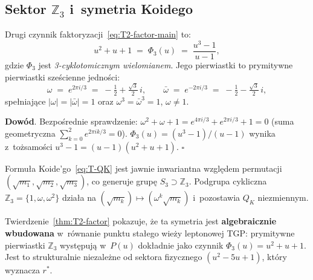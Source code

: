 \subsection{Sektor $\mathbb{Z}_3$ i~symetria Koidego}\label{app:T2-Z3}

\begin{proposition}\label{prop:T2-cyclo}
Drugi czynnik faktoryzacji~\eqref{eq:T2-factor-main} to:
\begin{equation}
  u^2 + u + 1 \;=\; \Phi_3(u) \;=\; \frac{u^3 - 1}{u - 1},
\end{equation}
gdzie $\Phi_3$ jest \emph{3-cyklotomicznym wielomianem}.
Jego pierwiastki to prymitywne pierwiastki sze\'scienne jedno\'sci:
\begin{equation}\label{eq:T2-omega}
  \omega \;=\; e^{2\pi i/3} \;=\; -\tfrac{1}{2} + \tfrac{\sqrt{3}}{2}\,i,
  \qquad
  \bar\omega \;=\; e^{-2\pi i/3} \;=\; -\tfrac{1}{2} - \tfrac{\sqrt{3}}{2}\,i,
\end{equation}
spe\l{}niaj\k{a}ce $|\omega| = |\bar\omega| = 1$
oraz $\omega^3 = \bar\omega^3 = 1$, $\omega \neq 1$.

\textbf{Dow\'od}.
Bezpo\'srednie sprawdzenie: $\omega^2+\omega+1 = e^{4\pi i/3}+e^{2\pi i/3}+1 = 0$
(suma geometryczna $\sum_{k=0}^{2} e^{2\pi ik/3} = 0$).
$\Phi_3(u) = (u^3-1)/(u-1)$ wynika z~to\.zsamo\'sci
$u^3-1 = (u-1)(u^2+u+1)$.
\hfill$\square$
\end{proposition}

\begin{remark}\label{rem:T2-Z3-koide}
Formu\l{}a Koide'go~\eqref{eq:T-QK} jest jawnie inwariantna
wzgl\k{e}dem permutacji $(\sqrt{m_1}, \sqrt{m_2}, \sqrt{m_3})$,
co generuje grup\k{e} $S_3 \supset \mathbb{Z}_3$.
Podgrupa cykliczna $\mathbb{Z}_3 = \{1, \omega, \omega^2\}$
dzia\l{}a na $(\sqrt{m_k}) \mapsto (\omega^k \sqrt{m_k})$
i~pozostawia $Q_K$ niezmiennym.

Twierdzenie~\ref{thm:T2-factor} pokazuje, \.ze ta symetria jest
\textbf{algebraicznie wbudowana} w~r\'ownanie punktu sta\l{}ego
wie\.zy leptonowej TGP: prymitywne pierwiastki $\mathbb{Z}_3$
wyst\k{e}puj\k{a} w~$P(u)$ dok\l{}adnie jako czynnik $\Phi_3(u) = u^2+u+1$.
Jest to strukturalnie niezale\.zne od sektora fizycznego $(u^2-5u+1)$,
kt\'ory wyznacza $r^*$.
\end{remark}


